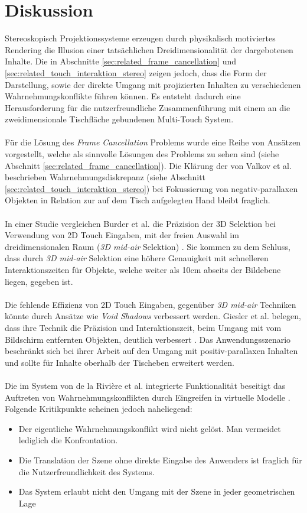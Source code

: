 \section{Diskussion}
\label{sec:diskussion_wahrnehmungskonflikte}

Stereoskopisch Projektionssysteme erzeugen durch physikalisch motiviertes Rendering die Illusion einer tatsächlichen Dreidimensionalität der dargebotenen Inhalte. Die in Abschnitte \ref{sec:related_frame_cancellation} und \ref{sec:related_touch_interaktion_stereo} zeigen jedoch, dass die Form der Darstellung, sowie der direkte Umgang mit projizierten Inhalten zu verschiedenen Wahrnehmungskonflikte führen können. Es entsteht dadurch eine Herausforderung für die nutzerfreundliche Zusammenführung mit einem an die zweidimensionale Tischfläche gebundenen Multi-Touch System. 
\\\\
Für die Lösung des \emph{Frame Cancellation} Problems wurde eine Reihe von Ansätzen vorgestellt, welche als sinnvolle Lösungen des Problems zu sehen sind (siehe Abschnitt \ref{sec:related_frame_cancellation}). Die Klärung der von Valkov et al. beschrieben Wahrnehmungsdiskrepanz (siehe Abschnitt \ref{sec:related_touch_interaktion_stereo}) bei Fokussierung von negativ-parallaxen Objekten in Relation zur auf dem Tisch aufgelegten Hand bleibt fraglich.
\\\\
In einer Studie vergleichen Burder et al. die Präzision der 3D Selektion bei Verwendung von 2D Touch Eingaben, mit der freien Auswahl im dreidimensionalen Raum (\emph{3D mid-air} Selektion) \cite{bruder:2013}. Sie kommen zu dem Schluss, dass durch \emph{3D mid-air} Selektion eine höhere Genauigkeit mit schnelleren Interaktionszeiten für Objekte, welche weiter als 10cm abseits der Bildebene liegen, gegeben ist.
\\\\
Die fehlende Effizienz von 2D Touch Eingaben, gegenüber \emph{3D mid-air} Techniken könnte durch Ansätze wie \emph{Void Shadows} verbessert werden. Giesler et al. belegen, dass ihre Technik die Präzision und Interaktionszeit, beim Umgang mit vom Bildschirm entfernten Objekten, deutlich verbessert \cite{giesler:2014}. Das Anwendungsszenario beschränkt sich bei ihrer Arbeit auf den Umgang mit positiv-parallaxen Inhalten und sollte für Inhalte oberhalb der Tischeben erweitert werden.
\\\\
Die im System von de la Rivière et al. integrierte Funktionalität beseitigt das Auftreten von Wahrnehmungskonflikten durch Eingreifen in virtuelle Modelle \cite{delariviere:2010}. Folgende Kritikpunkte scheinen jedoch naheliegend:

\begin{itemize}
	\item Der eigentliche Wahrnehmungskonflikt wird nicht gelöst. Man vermeidet lediglich die Konfrontation.
	\item Die Translation der Szene ohne direkte Eingabe des Anwenders ist fraglich für die Nutzerfreundlichkeit des Systems.
	\item Das System erlaubt nicht den Umgang mit der Szene in jeder geometrischen Lage
\end{itemize}